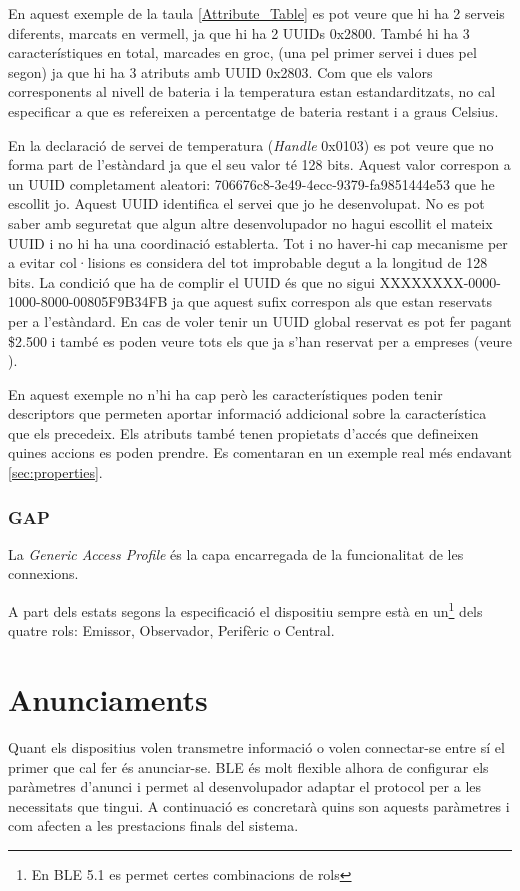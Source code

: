 En aquest exemple de la taula \ref{Attribute_Table} es pot veure que hi ha 2 serveis diferents, marcats en vermell, ja que hi ha 2 UUIDs 0x2800.
També hi ha 3 característiques en total, marcades en groc, (una pel primer servei i dues pel segon) ja que hi ha 3 atributs amb UUID 0x2803.
Com que els valors corresponents al nivell de bateria i la temperatura estan estandarditzats\cite{Battery_Level}\cite{Temperature_Characteristic}, no cal especificar a que es refereixen a percentatge de bateria restant i a graus Celsius.

En la declaració de servei de temperatura (\textit{Handle} 0x0103) es pot veure que no forma part de l'estàndard ja que el seu valor té 128 bits.
Aquest valor correspon a un UUID completament aleatori: 706676c8-3e49-4ecc-9379-fa9851444e53 que he escollit jo.
Aquest UUID identifica el servei que jo he desenvolupat.
No es pot saber amb seguretat que algun altre desenvolupador no hagui escollit el mateix UUID i no hi ha una coordinació establerta.
Tot i no haver-hi cap mecanisme per a evitar col·lisions es considera del tot improbable degut a la longitud  de 128 bits.
La condició que ha de complir el UUID és que no sigui XXXXXXXX-0000-1000-8000-00805F9B34FB ja que aquest sufix correspon als que estan reservats per a l'estàndard.
En cas de voler tenir un UUID global reservat es pot fer pagant \$2.500 i també es poden veure tots els que ja s'han reservat per a empreses (veure \cite{reservedUUIDs}).

En aquest exemple no n'hi ha cap però les característiques poden tenir descriptors \cite{descriptors} que permeten aportar informació addicional sobre la característica que els precedeix.
Els atributs també tenen propietats d'accés que defineixen quines accions es poden prendre.
Es comentaran en un exemple real més endavant \ref{sec:properties}.

\subsubsection{GAP}
La \textit{Generic Access Profile} és la capa encarregada de la funcionalitat de les connexions.

A part dels estats segons la especificació el dispositiu sempre està en un\footnote{En BLE 5.1 es permet certes combinacions de rols} dels quatre rols: Emissor, Observador, Perifèric o Central.

\section{Anunciaments}
Quant els dispositius volen transmetre informació o volen connectar-se entre sí el primer que cal fer és anunciar-se.
BLE és molt flexible alhora de configurar els paràmetres d'anunci i permet al desenvolupador adaptar el protocol per a les necessitats que tingui.
A continuació es concretarà quins son aquests paràmetres i com afecten a les prestacions finals del sistema.

